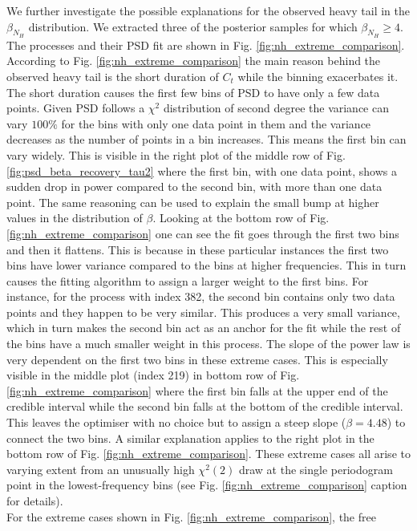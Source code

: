 \documentclass{aa}
\begin{document}
We further investigate the possible explanations for the observed heavy tail in the $\beta_{N_H}$ distribution. We extracted three of the posterior samples for which $\beta_{N_H} \ge 4$. The processes and their PSD fit are shown in Fig. \ref{fig:nh_extreme_comparison}. According to Fig. \ref{fig:nh_extreme_comparison} the main reason behind the observed heavy tail is the short duration of $C_t$ while the binning exacerbates it. The short duration causes the first few bins of PSD to have only a few data points. Given PSD follows a $\chi^2$ distribution of second degree the variance can vary $100\%$ for the bins with only one data point in them and the variance decreases as the number of points in a bin increases. This means the first bin can vary widely. This is visible in the right plot of the middle row of Fig. \ref{fig:psd_beta_recovery_tau2} where the first bin, with one data point, shows a sudden drop in power compared to the second bin, with more than one data point. The same reasoning can be used to explain the small bump at higher values in the distribution of $\beta$. Looking at the bottom row of Fig. \ref{fig:nh_extreme_comparison} one can see the fit goes through the first two bins and then it flattens. This is because in these particular instances the first two bins have lower variance compared to the bins at higher frequencies. This in turn causes the fitting algorithm to assign a larger weight to the first bins. For instance, for the process with index 382, the second bin contains only two data points and they happen to be very similar. This produces a very small variance, which in turn makes the second bin act as an anchor for the fit while the rest of the bins have a much smaller weight in this process. The slope of the power law is very dependent on the first two bins in these extreme cases. This is especially visible in the middle plot (index 219) in bottom row of Fig. \ref{fig:nh_extreme_comparison} where the first bin falls at the upper end of the credible interval while the second bin falls at the bottom of the credible interval. This leaves the optimiser with no choice but to assign a steep slope ($\beta = 4.48$) to connect the two bins. A similar explanation applies to the right plot in the bottom row of Fig. \ref{fig:nh_extreme_comparison}. These extreme cases all arise to varying extent from an unusually high $\chi^2(2)$ draw at the single periodogram point in the lowest-frequency bins (see Fig. \ref{fig:nh_extreme_comparison} caption for details). \\
For the extreme cases shown in Fig. \ref{fig:nh_extreme_comparison}, the free
\end{document}
